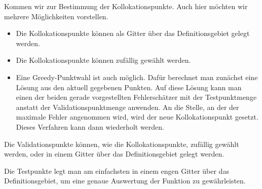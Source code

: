Kommen wir zur Bestimmung der Kollokationspunkte. Auch hier möchten wir mehrere Möglichkeiten vorstellen.
\begin{itemize}
\item
Die Kollokationspunkte können als Gitter über das Definitionsgebiet gelegt werden.
\item
Die Kollokationspunkte können zufällig gewählt werden.
\item
Eine Greedy-Punktwahl ist auch möglich. Dafür berechnet man zunächst eine Lösung aus den aktuell gegebenen Punkten. Auf diese Lösung kann man einen der beiden gerade vorgestellten Fehlerschätzer mit der Testpunktmenge anstatt der Validationspunktmenge anwenden. An die Stelle, an der der maximale Fehler angenommen wird, wird der neue Kollokationspunkt gesetzt. Dieses Verfahren kann dann wiederholt werden.
\end{itemize}

Die Validationspunkte können, wie die Kollokationspunkte, zufällig gewählt werden, oder in einem Gitter über das Definitionsgebiet gelegt werden.

Die Testpunkte legt man am einfachsten in einem engen Gitter über das Definitionsgebiet, um eine genaue Auswertung der Funktion zu gewährleisten.